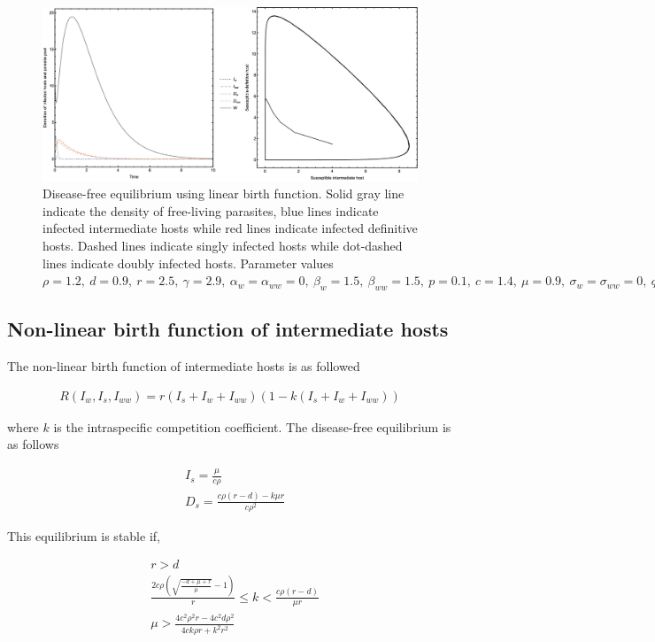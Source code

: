 \documentclass[11pt]{article}
\begin{document}
\begin{figure}
\includegraphics[width=\textwidth]{Figures/diseasefree_linear.jpg}
\caption{Disease-free equilibrium using linear birth function. Solid gray line indicate the density of free-living parasites, blue lines indicate infected intermediate hosts while red lines indicate infected definitive hosts. Dashed lines indicate singly infected hosts while dot-dashed lines indicate doubly infected hosts. Parameter values  $\rho = 1.2, \  d = 0.9, \  r = 2.5, \ \gamma = 2.9, \ \alpha_w =  \alpha_{ww} =  0, \ \beta_w  = 1.5, \ \beta_{ww} = 1.5, \ p = 0.1,  \ c = 1.4, \ \mu = 0.9,  \ \sigma_w = \sigma_{ww} = 0, \ q = 0.01, \  f_w = 6.5, \  f_{ww} = 7.5, \ \delta = 0.9$ } 
\label{fig:diseasefree:linear}
\end{figure}

\subsection*{Non-linear birth function of intermediate hosts}
The non-linear birth function of intermediate hosts is as followed

\begin{align*}
R(I_w, I_s,I_{ww}) = r (I_s + I_w + I_{ww}) (1 - k (I_s + I_w + I_{ww}))
\end{align*}

where $k$ is the intraspecific competition coefficient. The disease-free equilibrium is as follows

\begin{align*}
& I_s = \frac{\mu}{c \rho } \\
& D_s = \frac{c \rho  (r-d) - k \mu  r}{c \rho ^2}
\end{align*}

This equilibrium is stable if,

\begin{align*}
& r > d \\
& \frac{2 c \rho  \left(\sqrt{\frac{-d+\mu +r}{\mu }}-1\right)}{r}\leq k < \frac{c \rho  (r-d)}{\mu  r} \\
& \mu >\frac{4 c^2 \rho ^2 r - 4 c^2 d \rho ^2}{4 c k \rho r + k^2 r^2}
\end{align*}
\end{document}

